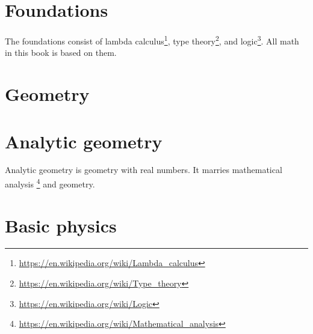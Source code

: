 \documentclass[12pt,twoside,openany,draft]{memoir}
\begin{document}
\mainmatter
{

    \part{Foundations}

The foundations consist of
lambda calculus\footnote{\url{https://en.wikipedia.org/wiki/Lambda_calculus}},
type theory\footnote{\url{https://en.wikipedia.org/wiki/Type_theory}},
and logic\footnote{\url{https://en.wikipedia.org/wiki/Logic}}.
All math in this book is based on them.

    
    
    
}
{
    \part{Geometry}

    
    
    

    \part{Analytic geometry}

    Analytic geometry is geometry with real numbers.
    It marries mathematical analysis%
    \footnote{\url{https://en.wikipedia.org/wiki/Mathematical_analysis}}
    and geometry.

    
    
    
    
    
    
    
    
    
    
}
{
    \part{Basic physics}
    
}
\end{document}
